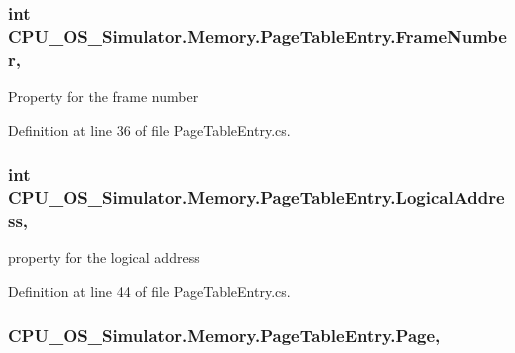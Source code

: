 \subsubsection[{Frame\+Number}]{\setlength{\rightskip}{0pt plus 5cm}int C\+P\+U\+\_\+\+O\+S\+\_\+\+Simulator.\+Memory.\+Page\+Table\+Entry.\+Frame\+Number\hspace{0.3cm}{\ttfamily [get]}, {\ttfamily [set]}}\label{class_c_p_u___o_s___simulator_1_1_memory_1_1_page_table_entry_a4c1fb37bb101546867d77a4f781ba51d}


Property for the frame number 



Definition at line 36 of file Page\+Table\+Entry.\+cs.

\hypertarget{class_c_p_u___o_s___simulator_1_1_memory_1_1_page_table_entry_a22a89428526ff3d2c8247a14eba38242}{}
\subsubsection[{Logical\+Address}]{\setlength{\rightskip}{0pt plus 5cm}int C\+P\+U\+\_\+\+O\+S\+\_\+\+Simulator.\+Memory.\+Page\+Table\+Entry.\+Logical\+Address\hspace{0.3cm}{\ttfamily [get]}, {\ttfamily [set]}}\label{class_c_p_u___o_s___simulator_1_1_memory_1_1_page_table_entry_a22a89428526ff3d2c8247a14eba38242}


property for the logical address 



Definition at line 44 of file Page\+Table\+Entry.\+cs.

\hypertarget{class_c_p_u___o_s___simulator_1_1_memory_1_1_page_table_entry_aa592969e0204f85ad96a9ab76ca7f50d}{}
\subsubsection[{Page}]{ C\+P\+U\+\_\+\+O\+S\+\_\+\+Simulator.\+Memory.\+Page\+Table\+Entry.\+Page\hspace{0.3cm}{\ttfamily [get]}, {\ttfamily [set]}}\label{class_c_p_u___o_s___simulator_1_1_memory_1_1_page_table_entry_aa592969e0204f85ad96a9ab76ca7f50d}


